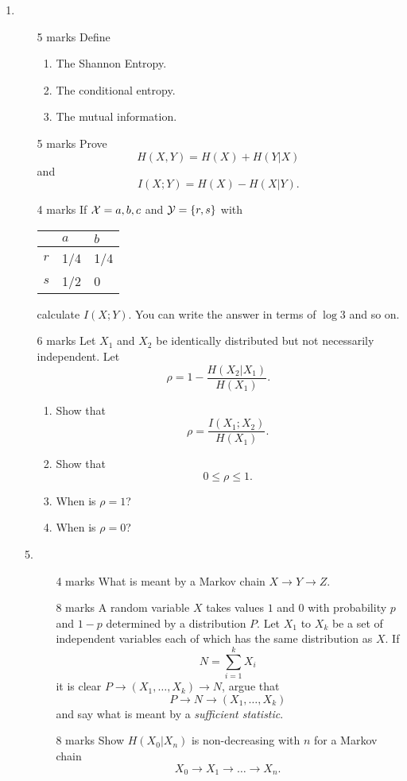 \documentclass[12pt]{article}
\begin{document}
\begin{enumerate}
\item %
\begin{enumerate}
\item [5 marks] Define
\begin{enumerate}
\item The Shannon Entropy.
\item The conditional entropy.
\item The mutual information.
\end{enumerate}
\item [5 marks] Prove
$$H(X,Y)=H(X)+H(Y|X)$$
and
$$I(X;Y)=H(X)-H(X|Y).$$
\item [4 marks] If ${\cal X}={a,b,c}$ and ${\cal Y}=\{r,s\}$ with
\begin{tabular}{l|ll}
&$a$&$b$\\
\hline
$r$&1/4&1/4\\
$s$&1/2&0
\end{tabular}
calculate $I(X;Y)$. You can write the answer in terms of $\log{3}$ and so on.
\item [6 marks] Let $X_1$ and $X_2$ be identically distributed but not necessarily independent. Let
$$\rho=1-\frac{H(X_2|X_1)}{H(X_1)}.$$
\begin{enumerate}
\item Show that $$\rho=\frac{I(X_1;X_2)}{H(X_1)}.$$
\item Show that $$0\le \rho\le 1.$$
\item When is $\rho=1$?
\item When is $\rho=0$?
\end{enumerate}

\item %
\begin{enumerate}
\item [4 marks] What is meant by a Markov chain $X\rightarrow
  Y\rightarrow Z$.
\item [8 marks] A random variable $X$ takes values $1$ and $0$ with
  probability $p$ and $1-p$ determined by a distribution $P$. Let $X_1$ to $X_k$ be a set of independent variables each of which has the same distribution as $X$. If 
$$N=\sum_{i=1}^k X_i$$
it is clear $P\rightarrow (X_1,\ldots,X_k)\rightarrow N$, argue that
$$P\rightarrow N\rightarrow (X_1,\ldots,X_k)$$ 
and say what is meant by a {\sl sufficient statistic}.
\item [8 marks] Show $H(X_0|X_n)$ is non-decreasing with $n$ for a Markov chain
$$X_0\rightarrow X_1\rightarrow \ldots \rightarrow X_n.$$


\end{enumerate}
\end{enumerate}
\end{enumerate}
\end{document}
